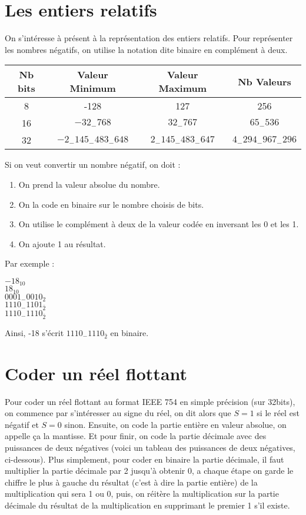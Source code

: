 \documentclass{article}
\begin{document}
	\section{Les entiers relatifs}
		On s'intéresse à présent à la représentation des entiers relatifs. Pour représenter les nombres négatifs, on utilise la notation dite binaire en complément à deux.
	
		\begin{center}
			\begin{tabular}{ | c | c | c | c | }
  				\hline
  					Nb bits & Valeur Minimum & Valeur Maximum & Nb Valeurs \\
				\hline
					8 & -128 & 127 & 256 \\
				\hline
					16 & $-32_-768$ & $32_-767$ & $65_-536$ \\
				\hline
					32 & $-2_-145_-483_-648$ & $2_-145_-483_-647$ & $4_-294_-967_-296$ \\
				\hline
			\end{tabular}
		\end{center}
		
		Si on veut convertir un nombre négatif, on doit :
		\begin{enumerate}
			\item On prend la valeur absolue du nombre.
			\item On la code en binaire sur le nombre choisis de bits.
			\item On utilise le complément à deux de la valeur codée en inversant les 0 et les 1.
			\item On ajoute 1 au résultat.
		\end{enumerate}
		
		Par exemple :

		\begin{center}
			$-18_{10}$ \\
			$18_{10}$ \\
			$0001_-0010_2$ \\
			$1110_-1101_{\bar2}$ \\
			$1110_-1110_{\bar2}$ \\			
		\end{center}

		Ainsi, -18 s'écrit $1110_-1110_{\bar2}$ en binaire.
	
	\section{Coder un réel flottant}
		Pour coder un réel flottant au format IEEE 754 en simple précision (sur 32bits), on commence par s'intéresser au signe du réel, on dit alors que $S = 1$ si le réel est négatif et $S = 0$ sinon. Ensuite, on code la partie entière en valeur absolue, on appelle ça la mantisse. Et pour finir, on code la partie décimale avec des puissances de deux négatives (voici un tableau des puissances de deux négatives, ci-dessous). Plus simplement, pour coder en binaire la partie décimale, il faut multiplier la partie décimale par 2 jusqu'à obtenir 0, a chaque étape on garde le chiffre le plus à gauche du résultat (c'est à dire la partie entière) de la multiplication qui sera 1 ou 0, puis, on réitère la multiplication sur la partie décimale du résultat de la multiplication en supprimant le premier 1 s'il existe.
		
\end{document}
